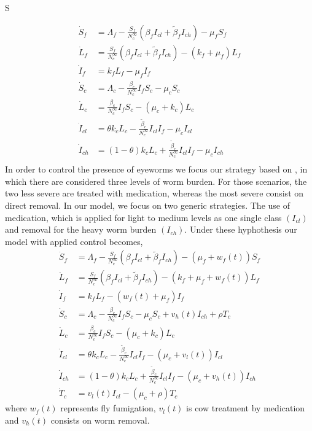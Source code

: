 S\documentclass[preprint,12pt]{elsarticle}
\begin{document}
\begin{equation}\label{Eq:SIvectorhostmodel_v2}
\begin{aligned}
    \dot{S}_f&= 
        \Lambda_f-\frac{S_f}{N_c^{\infty}}\left(\beta_fI_{cl}+\tilde{\beta}_fI_{ch} \right)-\mu_fS_f
    \\
    \dot{L}_f&= 
        \frac{S_f}{N_c^{\infty}}\left(\beta_fI_{cl}+\tilde{\beta}_fI_{ch}\right)-\left(k_f+\mu_f\right)L_f
    \\
    \dot{I}_f&= 
        k_f L_f-\mu_fI_f
    \\
    \dot{S}_c&= 
        \Lambda_c-\frac{\beta_c}{N_c^{\infty}}I_fS_c-\mu_cS_c
    \\
    \dot{L}_c&= 
        \frac{\beta_c}{N_c^{\infty}}I_fS_c-\left(\mu_c+k_c\right)L_c
    \\
    \dot{I}_{cl}&=  \theta k_c L_c- \frac{\tilde{\beta}_c}{N_c^{\infty}}I_{cl}I_f-\mu_c I_{cl} 
    \\
    \dot{I}_{ch}&= (1-\theta) k_c L_c + \frac{\tilde{\beta}_c}{N_c^{\infty}}I_{cl}I_f- \mu_c I_{ch}
    \\
\end{aligned}
\end{equation}
\noindent In order to control the presence of eyeworms we focus our strategy based on \cite{Manjunath:2016}, in which there are considered three levels of worm burden. For those scenarios, the two less severe are treated with medication, whereas the most severe consist on direct removal. In our model, we focus on two generic strategies. The use of medication, which is applied for light to medium levels as one single class $(I_{cl})$ and removal for the heavy worm burden $(I_{ch})$. Under these hyphothesis our model with applied control becomes,  
\begin{equation}\label{Eq:SIvectorhostmodel_v2controlled}
\begin{aligned}
    \dot{S}_f&= 
        \Lambda_f-\frac{S_f}{N_c^{\infty}}\left(\beta_fI_{cl}+\tilde{\beta}_fI_{ch} \right)-\left(\mu_f+w_f(t)\right)S_f
    \\
    \dot{L}_f&= 
        \frac{S_f}{N_c^{\infty}}\left(\beta_fI_{cl}+\tilde{\beta}_fI_{ch}\right)-\left(k_f+\mu_f+w_f(t)\right)L_f
    \\
    \dot{I}_f&= 
        k_f L_f-\left(w_f(t)+\mu_f\right)I_f
    \\
    \dot{S}_c&= 
        \Lambda_c-\frac{\beta_c}{N_c^{\infty}}I_fS_c-\mu_cS_c+v_h(t)I_{ch}+\rho T_c
    \\
    \dot{L}_c&= 
        \frac{\beta_c}{N_c^{\infty}}I_fS_c-\left(\mu_c+k_c\right)L_c
    \\
    \dot{I}_{cl}&=  \theta k_c L_c- \frac{\tilde{\beta}_c}{N_c^{\infty}}I_{cl}I_f-(\mu_c+v_l(t)) I_{cl} 
    \\
    \dot{I}_{ch}&= (1-\theta) k_c L_c + \frac{\tilde{\beta}_c}{N_c^{\infty}}I_{cl}I_f- (\mu_c+v_h(t)) I_{ch}
    \\
    \dot{T}_c&= v_l(t)I_{cl}-\left(\mu_c+\rho\right)T_c
\end{aligned}
\end{equation}
where $w_f(t)$ represents fly fumigation, $v_l(t)$ is cow treatment by medication and $v_h(t)$ consists on worm removal.\\
\end{document}

